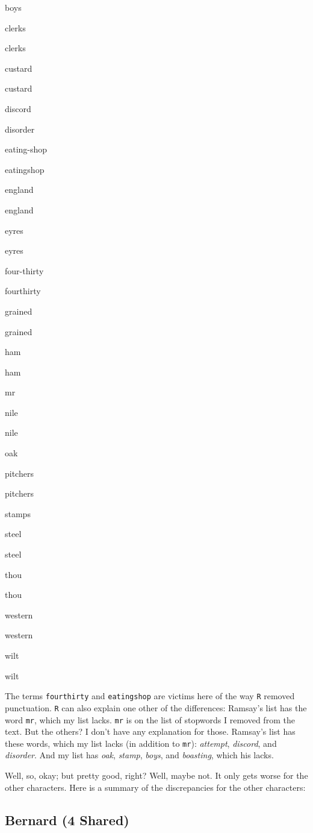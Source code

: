 \documentclass[
  12pt,
]{article}
\begin{document}
boys

clerks

clerks

custard

custard

discord

disorder

eating-shop

eatingshop

england

england

eyres

eyres

four-thirty

fourthirty

grained

grained

ham

ham

mr

nile

nile

oak

pitchers

pitchers

stamps

steel

steel

thou

thou

western

western

wilt

wilt

The terms \texttt{fourthirty} and \texttt{eatingshop} are victims here
of the way \texttt{R} removed punctuation. \texttt{R} can also explain
one other of the differences: Ramsay's list has the word \texttt{mr},
which my list lacks. \texttt{mr} is on the list of stopwords I removed
from the text. But the others? I don't have any explanation for those.
Ramsay's list has these words, which my list lacks (in addition to
\texttt{mr}): \emph{attempt}, \emph{discord}, and \emph{disorder}. And
my list has \emph{oak}, \emph{stamp}, \emph{boys}, and \emph{boasting},
which his lacks.

Well, so, okay; but pretty good, right? Well, maybe not. It only gets
worse for the other characters. Here is a summary of the discrepancies
for the other characters:

\hypertarget{bernard-4-shared}{%
\subsection{Bernard (4 Shared)}\label{bernard-4-shared}}
\end{document}
